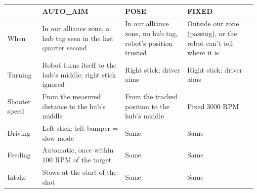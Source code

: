\documentclass[11pt]{article}
\begin{document}
\begin{xltabular}{\linewidth}{>{\raggedright\arraybackslash}p{2.3cm} L L L}
\toprule
 & \textbf{AUTO\_AIM} & \textbf{POSE} & \textbf{FIXED} \\
\midrule
\endhead
When          & In our alliance zone, a hub tag seen in the last quarter second & In our alliance zone, no hub tag, robot's position trusted & Outside our zone (passing), or the robot can't tell where it is \\
Turning       & Robot turns itself to the hub's middle; right stick ignored & Right stick; driver aims & Right stick; driver aims \\
Shooter speed & From the measured distance to the hub's middle & From the tracked position to the hub's middle & Fixed 3000 RPM \\
Driving       & Left stick; left bumper = slow mode & Same & Same \\
Feeding       & Automatic, once within 100 RPM of the target & Same & Same \\
Intake        & Stows at the start of the shot & Same & Same \\
\bottomrule
\end{xltabular}
\end{document}
